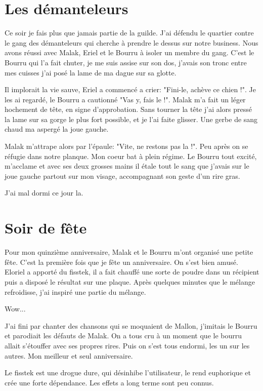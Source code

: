\documentclass[10pt,a4paper,twoside,twocolumn,openany]{book}
\begin{document}
\section{Les démanteleurs}

Ce soir je fais plus que jamais partie de la guilde. J'ai défendu le quartier contre le gang des
démanteleurs qui cherche à prendre le dessus sur notre business.
Nous avons réussi avec Malak, Eriel et le Bourru à isoler un membre du gang. C'est le Bourru
qui l'a fait chuter, je me suis assise sur son dos, j'avais son tronc entre mes cuisses j'ai posé 
la lame de ma dague sur sa glotte. 

Il implorait la vie sauve, Eriel a commencé a crier: "Fini-le, achève ce chien !". Je les ai regardé,
le Bourru a cautionné "Vas y, fais le !". Malak m'a fait un léger hochement de tête, en signe
d'approbation. Sans tourner la tête j'ai alors pressé la lame sur sa gorge le plus fort possible,
et je l'ai faite glisser. Une gerbe de sang chaud ma aspergé la joue gauche.

Malak m'attrape alors par l'épaule: "Vite, ne restons pas la !". Peu après on se réfugie dans notre planque.
Mon coeur bat à plein régime. Le Bourru tout excité, m'acclame et avec ses deux grosses mains il étale
tout le sang que j'avais sur le joue gauche partout sur mon visage, accompagnant son geste d'un rire gras. 

J'ai mal dormi ce jour la.

\section{Soir de fête}

Pour mon quinzième anniversaire, Malak et le Bourru m'ont organisé une petite fête. C'est la première fois
que je fête un anniversaire. On s'est bien amusé. Eloriel a apporté du fisstek, il a fait chauffé une 
sorte de poudre dans un récipient puis a disposé le résultat sur une plaque. Après quelques minutes
que le mélange refroidisse, j'ai inspiré une partie du mélange.

Wow...

J'ai fini par chanter des chansons qui se moquaient de Mallon, j'imitais le Bourru et parodiait
les défauts de Malak. On a tous cru à un moment que le bourru allait s'étouffer avec ses propres rires.
Puis on s'est tous endormi, les un sur les autres. Mon meilleur et seul anniversaire.

\begin{quotebox}
Le fisstek est une drogue dure, qui désinhibe l'utilisateur, le rend euphorique et crée une forte dépendance.
Les effets a long terme sont peu connus.
\end{quotebox}
\end{document}

